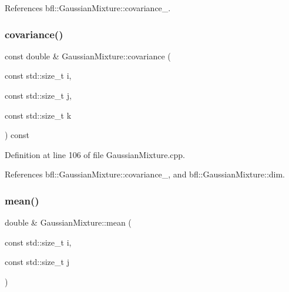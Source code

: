 References bfl\+::\+Gaussian\+Mixture\+::covariance\+\_\+.

\mbox{\label{classbfl_1_1GaussianMixture_a4ca0b098be0fc923f454e73e9dccf78f}} 
\subsubsection{\texorpdfstring{covariance()}{covariance()}\hspace{0.1cm}{\footnotesize\ttfamily [8/8]}}
{\footnotesize\ttfamily const double \& Gaussian\+Mixture\+::covariance (\begin{DoxyParamCaption}\item[{const std\+::size\+\_\+t}]{i,  }\item[{const std\+::size\+\_\+t}]{j,  }\item[{const std\+::size\+\_\+t}]{k }\end{DoxyParamCaption}) const\hspace{0.3cm}{\ttfamily [inherited]}}



Definition at line 106 of file Gaussian\+Mixture.\+cpp.



References bfl\+::\+Gaussian\+Mixture\+::covariance\+\_\+, and bfl\+::\+Gaussian\+Mixture\+::dim.

\mbox{\label{classbfl_1_1GaussianMixture_a21013d54d99ca5bfd1ec566a0815821e}} 
\subsubsection{\texorpdfstring{mean()}{mean()}\hspace{0.1cm}{\footnotesize\ttfamily [1/6]}}
{\footnotesize\ttfamily double \& Gaussian\+Mixture\+::mean (\begin{DoxyParamCaption}\item[{const std\+::size\+\_\+t}]{i,  }\item[{const std\+::size\+\_\+t}]{j }\end{DoxyParamCaption})\hspace{0.3cm}{\ttfamily [inherited]}}



